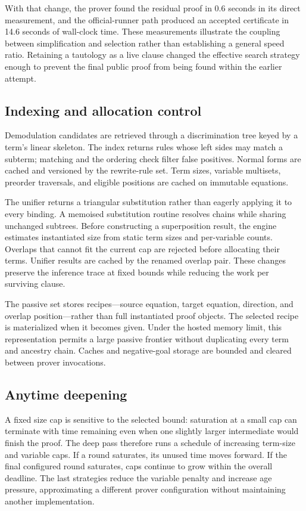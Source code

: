 \documentclass[10pt,twocolumn]{article}
\begin{document}
With that change, the prover found the residual proof in 0.6 seconds in its
direct measurement, and the official-runner path produced an accepted
certificate in 14.6 seconds of wall-clock time.  These measurements illustrate
the coupling between simplification and selection rather than establishing a
general speed ratio.  Retaining a tautology as a live clause changed the
effective search strategy enough to prevent the final public proof from being
found within the earlier attempt.

\subsection{Indexing and allocation control}

Demodulation candidates are retrieved through a discrimination tree keyed by
a term's linear skeleton.  The index returns rules whose left sides may match a
subterm; matching and the ordering check filter false positives.  Normal forms
are cached and versioned by the rewrite-rule set.  Term sizes, variable
multisets, preorder traversals, and eligible positions are cached on immutable
equations.

The unifier returns a triangular substitution rather than eagerly applying it
to every binding.  A memoised substitution routine resolves chains while
sharing unchanged subtrees.  Before constructing a superposition result, the
engine estimates instantiated size from static term sizes and per-variable
counts.  Overlaps that cannot fit the current cap are rejected before
allocating their terms.  Unifier results are cached by the renamed overlap
pair.  These changes preserve the inference trace at fixed bounds while
reducing the work per surviving clause.

The passive set stores recipes---source equation, target equation, direction,
and overlap position---rather than full instantiated proof objects.  The
selected recipe is materialized when it becomes given.  Under the hosted
memory limit, this representation permits a large passive frontier without
duplicating every term and ancestry chain.  Caches and negative-goal storage
are bounded and cleared between prover invocations.

\subsection{Anytime deepening}

A fixed size cap is sensitive to the selected bound: saturation at a small cap
can terminate with time remaining even when one slightly larger intermediate would finish the proof.
The deep pass therefore runs a schedule of increasing term-size and variable
caps.  If a round saturates, its unused time moves forward.  If the final
configured round saturates, caps continue to grow within the overall deadline.
The last strategies reduce the variable penalty and increase age pressure,
approximating a different prover configuration without maintaining another
implementation.
\end{document}
